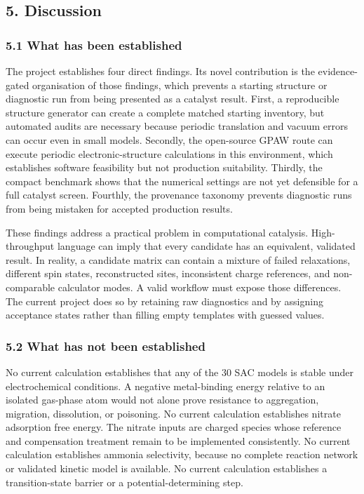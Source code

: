 \documentclass[
]{article}
\begin{document}
\hypertarget{discussion}{%
\subsection{5. Discussion}\label{discussion}}

\hypertarget{what-has-been-established}{%
\subsubsection{5.1 What has been
established}\label{what-has-been-established}}

The project establishes four direct findings. Its novel contribution is
the evidence-gated organisation of those findings, which prevents a
starting structure or diagnostic run from being presented as a catalyst
result. First, a reproducible structure generator can create a complete
matched starting inventory, but automated audits are necessary because
periodic translation and vacuum errors can occur even in small models.
Secondly, the open-source GPAW route can execute periodic
electronic-structure calculations in this environment, which establishes
software feasibility but not production suitability. Thirdly, the
compact benchmark shows that the numerical settings are not yet
defensible for a full catalyst screen. Fourthly, the provenance taxonomy
prevents diagnostic runs from being mistaken for accepted production
results.

These findings address a practical problem in computational catalysis.
High-throughput language can imply that every candidate has an
equivalent, validated result. In reality, a candidate matrix can contain
a mixture of failed relaxations, different spin states, reconstructed
sites, inconsistent charge references, and non-comparable calculator
modes. A valid workflow must expose those differences. The current
project does so by retaining raw diagnostics and by assigning acceptance
states rather than filling empty templates with guessed values.

\hypertarget{what-has-not-been-established}{%
\subsubsection{5.2 What has not been
established}\label{what-has-not-been-established}}

No current calculation establishes that any of the 30 SAC models is
stable under electrochemical conditions. A negative metal-binding energy
relative to an isolated gas-phase atom would not alone prove resistance
to aggregation, migration, dissolution, or poisoning. No current
calculation establishes nitrate adsorption free energy. The nitrate
inputs are charged species whose reference and compensation treatment
remain to be implemented consistently. No current calculation
establishes ammonia selectivity, because no complete reaction network or
validated kinetic model is available. No current calculation establishes
a transition-state barrier or a potential-determining step.
\end{document}
